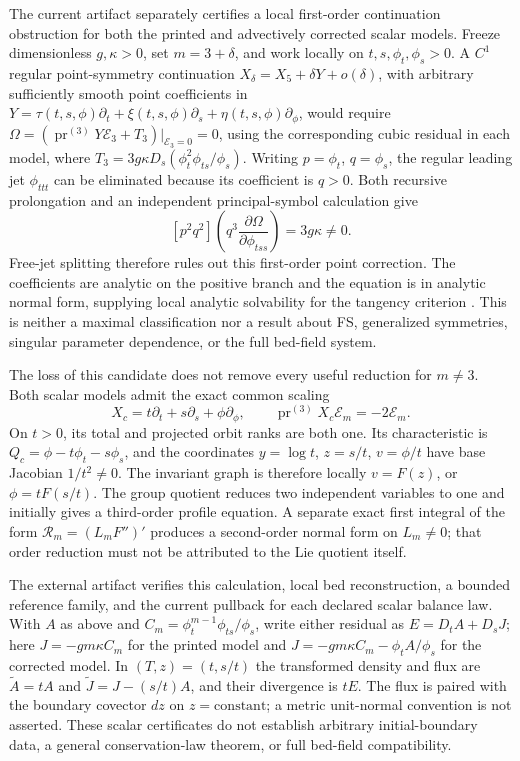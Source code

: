 \documentclass[11pt]{article}
\theoremstyle{definition}
\newcommand{\E}{\mathcal E}
\newcommand{\pr}{\operatorname{pr}}
\begin{document}
The current artifact separately certifies a local first-order continuation
obstruction for both the printed and advectively corrected scalar models. Freeze
dimensionless $g,\kappa>0$, set $m=3+\delta$, and work locally on
$t,s,\phi_t,\phi_s>0$. A $C^1$ regular point-symmetry continuation
$X_\delta=X_5+\delta Y+o(\delta)$, with arbitrary sufficiently smooth
point coefficients in $Y=\tau(t,s,\phi)\partial_t+
\xi(t,s,\phi)\partial_s+\eta(t,s,\phi)\partial_\phi$, would require
$\Omega=(\pr^{(3)}Y\E_3+T_3)|_{\E_3=0}=0$, using the corresponding
cubic residual in each model, where
$T_3=3g\kappa D_s(\phi_t^2\phi_{ts}/\phi_s)$.
Writing $p=\phi_t$, $q=\phi_s$, the regular leading jet
$\phi_{ttt}$ can be eliminated because its coefficient is $q>0$.
Both recursive prolongation and an independent principal-symbol calculation give
\[
 [p^2q^2]\!\left(q^3\frac{\partial\Omega}{\partial\phi_{tss}}\right)
 =3g\kappa\ne0.
\]
Free-jet splitting therefore rules out this first-order point correction.
The coefficients are analytic on the positive branch and the equation is in
analytic normal form, supplying local analytic solvability for the tangency
criterion \cite{olver}. This is neither a maximal classification nor a result
about FS, generalized symmetries, singular parameter dependence, or the full
bed-field system.

The loss of this candidate does not remove every useful reduction for
$m\ne3$. Both
scalar models admit the exact common scaling
\begin{equation}
 X_c=t\partial_t+s\partial_s+\phi\partial_\phi,
 \qquad \pr^{(3)}X_c\E_m=-2\E_m.
 \label{eq:common-scaling}
\end{equation}
On $t>0$, its total and projected orbit ranks are both one. Its characteristic
is $Q_c=\phi-t\phi_t-s\phi_s$, and the coordinates
$y=\log t$, $z=s/t$, $v=\phi/t$ have base Jacobian $1/t^2\ne0$.
The invariant graph is therefore locally $v=F(z)$, or
$\phi=tF(s/t)$. The group quotient reduces two independent variables to one
and initially gives a third-order profile equation. A separate exact first
integral of the form $\mathcal R_m=(L_mF'')'$ produces a second-order normal
form on $L_m\ne0$; that order reduction must not be attributed to the Lie
quotient itself.

The external artifact verifies this calculation, local bed reconstruction,
a bounded reference family, and the current pullback for each declared scalar
balance law. With $A$ as above and
$C_m=\phi_t^{m-1}\phi_{ts}/\phi_s$, write either residual as
$E=D_tA+D_sJ$; here
$J=-gm\kappa C_m$ for the printed model and
$J=-gm\kappa C_m-\phi_tA/\phi_s$ for the corrected model.
In $(T,z)=(t,s/t)$ the transformed density and flux are
$\widetilde A=tA$ and $\widetilde J=J-(s/t)A$, and their divergence is
$tE$. The flux is paired with the boundary covector $dz$ on
$z=\mathrm{constant}$; a metric unit-normal convention is not asserted.
These scalar certificates do not establish arbitrary initial-boundary data,
a general conservation-law theorem, or full bed-field compatibility.
\end{document}

